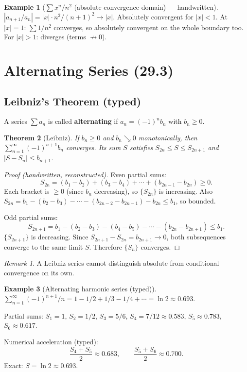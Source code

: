 \documentclass[12pt, a4paper]{article}
\newtheorem{theorem}{Theorem}[section]
\theoremstyle{definition}
\newtheorem{example}[theorem]{Example}
\theoremstyle{remark}
\newtheorem*{remark}{Remark}
\begin{document}
\begin{example}[$\sum x^n/n^2$ (absolute convergence domain) --- handwritten]
$|a_{n+1}/a_n| = |x| \cdot n^2/(n+1)^2 \to |x|$.
Absolutely convergent for $|x| < 1$.
At $|x| = 1$: $\sum 1/n^2$ converges, so absolutely convergent on the whole boundary too.
For $|x| > 1$: diverges (terms $\not\to 0$).
\end{example}

\section{Alternating Series (29.3)}

\subsection{Leibniz's Theorem (typed)}

A series $\sum a_n$ is called \textbf{alternating} if $a_n = (-1)^n b_n$ with $b_n \geq 0$.

\begin{theorem}[Leibniz]
If $b_n \geq 0$ and $b_n \searrow 0$ monotonically, then $\sum_{n=1}^\infty (-1)^{n+1} b_n$ converges.
Its sum $S$ satisfies $S_{2n} \leq S \leq S_{2n+1}$ and $|S - S_n| \leq b_{n+1}$.
\end{theorem}

\begin{proof}[Proof (handwritten, reconstructed)]
Even partial sums:
\[
  S_{2n} = (b_1-b_2) + (b_3-b_4) + \cdots + (b_{2n-1}-b_{2n}) \geq 0.
\]
Each bracket is $\geq 0$ (since $b_n$ decreasing), so $\{S_{2n}\}$ is increasing.
Also $S_{2n} = b_1 - (b_2-b_3) - \cdots - (b_{2n-2}-b_{2n-1}) - b_{2n} \leq b_1$, so bounded.

Odd partial sums:
\[
  S_{2n+1} = b_1 - (b_2-b_3) - (b_4-b_5) - \cdots - (b_{2n}-b_{2n+1}) \leq b_1.
\]
$\{S_{2n+1}\}$ is decreasing. Since $S_{2n+1} - S_{2n} = b_{2n+1} \to 0$, both subsequences converge to the same limit $S$.
Therefore $\{S_n\}$ converges.
\end{proof}

\begin{remark}
A Leibniz series cannot distinguish absolute from conditional convergence on its own.
\end{remark}

\begin{example}[Alternating harmonic series (typed)]
$\sum_{n=1}^\infty (-1)^{n+1}/n = 1 - 1/2 + 1/3 - 1/4 + \cdots = \ln 2 \approx 0.693$.

Partial sums: $S_1=1$, $S_2=1/2$, $S_3=5/6$, $S_4=7/12\approx0.583$, $S_5\approx0.783$, $S_6\approx0.617$.

Numerical acceleration (typed):
\[
  \frac{S_4+S_5}{2} \approx 0.683, \qquad \frac{S_5+S_6}{2} \approx 0.700.
\]
Exact: $S = \ln 2 \approx 0.693$.
\end{example}
\end{document}
